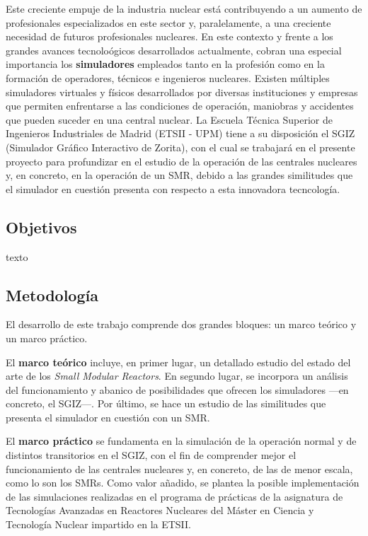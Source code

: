 Este creciente empuje de la industria nuclear está contribuyendo a un aumento de profesionales especializados en este sector y, paralelamente, a una creciente necesidad de futuros profesionales nucleares. En este contexto y frente a los grandes avances tecnoloógicos desarrollados actualmente, cobran una especial importancia los \textbf{\gls{simuladores}} empleados tanto en la profesión como en la formación de operadores, técnicos e ingenieros nucleares. Existen múltiples simuladores virtuales y físicos desarrollados por diversas instituciones y empresas que permiten enfrentarse a las condiciones de operación, maniobras y accidentes que pueden suceder en una central nuclear. La Escuela Técnica Superior de Ingenieros Industriales de Madrid (ETSII - UPM) tiene a su disposición el SGIZ (Simulador Gráfico Interactivo de Zorita), con el cual se trabajará en el presente proyecto para profundizar en el estudio de la operación de las centrales nucleares y, en concreto, en la operación de un SMR, debido a las grandes similitudes que el simulador en cuestión presenta con respecto a esta innovadora tecncología.

\subsection{Objetivos}
texto
\subsection{Metodología}

El desarrollo de este trabajo comprende dos grandes bloques: un marco teórico y un marco práctico.

El \textbf{marco teórico} incluye, en primer lugar, un detallado estudio del estado del arte de los \emph{Small Modular Reactors}. En segundo lugar, se incorpora un análisis del funcionamiento y abanico de posibilidades que ofrecen los simuladores ---en concreto, el SGIZ---. Por último, se hace un estudio de las similitudes que presenta el simulador en cuestión con un SMR. 

El \textbf{marco práctico} se fundamenta en la simulación de la operación normal y de distintos transitorios en el SGIZ, con el fin de comprender mejor el funcionamiento de las centrales nucleares y, en concreto, de las de menor escala, como lo son los SMRs. Como valor añadido, se plantea la posible implementación de las simulaciones realizadas en el programa de prácticas de la asignatura de Tecnologías Avanzadas en Reactores Nucleares del Máster en Ciencia y Tecnología Nuclear impartido en la ETSII.